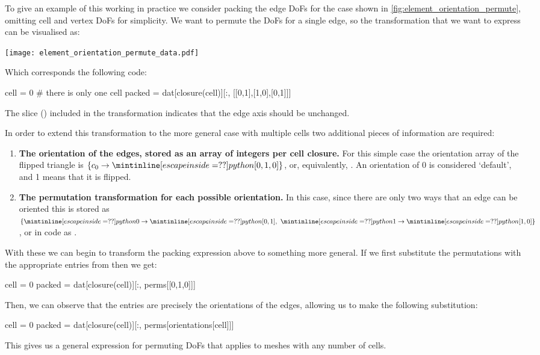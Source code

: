 \documentclass[thesis]{subfiles}
\begin{document}
To give an example of this working in practice we consider packing the edge DoFs for the case shown in \cref{fig:element_orientation_permute}, omitting cell and vertex DoFs for simplicity.
We want to permute the DoFs for a single edge, so the transformation that we want to express can be visualised as:
\begin{center}
  \texttt{[image: element\_orientation\_permute\_data.pdf]}
\end{center}
Which corresponds the following  code:
\begin{pyinline}
  cell = 0  # there is only one cell
  packed = dat[closure(cell)][:, [[0,1],[1,0],[0,1]]]
\end{pyinline}
The slice (\pycode{:}) included in the transformation indicates that the edge axis should be unchanged.

In order to extend this transformation to the more general case with multiple cells two additional pieces of information are required:
\begin{enumerate}
  \item
    \textbf{The orientation of the edges, stored as an array of integers per cell closure.}
    For this simple case the orientation array of the flipped triangle is $\{ c_0 \to \pycode{[0,1,0]} \}$, or, equivalently, .
    An orientation of 0 is considered `default', and 1 means that it is flipped.

  \item
    \textbf{The permutation transformation for each possible orientation.}
    In this case, since there are only two ways that an edge can be oriented this is stored as $\{ \pycode{0} \to \pycode{[0,1]},\ \pycode{1} \to \pycode{[1,0]} \}$, or in code as .
\end{enumerate}

With these we can begin to transform the packing expression above to something more general.
If we first substitute the permutations \pycode{[[0,1],[1,0],[0,1]]} with the appropriate entries from  then we get:
\begin{pyinline}
  cell = 0
  packed = dat[closure(cell)][:, perms[[0,1,0]]]
\end{pyinline}
Then, we can observe that the entries \pycode{[0,1,0]} are precisely the orientations of the edges, allowing us to make the following substitution:
\begin{pyinline}
  cell = 0
  packed = dat[closure(cell)][:, perms[orientations[cell]]]
\end{pyinline}
This gives us a general expression for permuting DoFs that applies to meshes with any number of cells.
\end{document}
